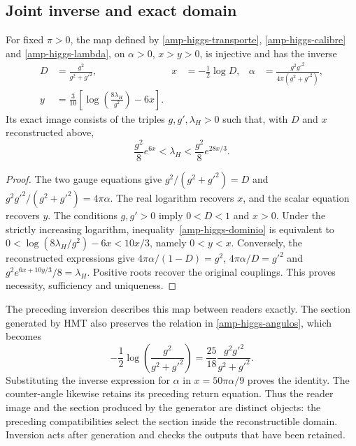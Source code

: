 \subsection{Joint inverse and exact domain}

\begin{theorem}
\label{amp-higgs-inversa-teorema}
For fixed $\pi>0$, the map defined by
\eqref{amp-higgs-transporte}, \eqref{amp-higgs-calibre} and
\eqref{amp-higgs-lambda}, on $\alpha>0$, $x>y>0$, is injective and has
the inverse
\begin{equation}
 \begin{aligned}
 D&=\frac{g^2}{g^2+g'^2},&
 x&=-\frac12\log D,&
 \alpha&=\frac{g^2g'^2}{4\pi(g^2+g'^2)},\\
 y&=\frac3{10}\left[\log\!\left(\frac{8\lambda_H}{g^2}\right)-6x\right].
 \end{aligned}
 \label{amp-higgs-inversa}
\end{equation}
Its exact image consists of the triples $g,g',\lambda_H>0$ such that,
with $D$ and $x$ reconstructed above,
\begin{equation}
 \frac{g^2}{8}e^{6x}<\lambda_H<\frac{g^2}{8}e^{28x/3}.
 \label{amp-higgs-dominio}
\end{equation}
\end{theorem}
\begin{proof}
The two gauge equations give
$g^2/(g^2+g'^2)=D$ and
$g^2g'^2/(g^2+g'^2)=4\pi\alpha$. The real logarithm recovers $x$,
and the scalar equation recovers $y$. The conditions $g,g'>0$ imply
$0<D<1$ and $x>0$. Under the strictly increasing logarithm,
inequality~\eqref{amp-higgs-dominio} is equivalent to
$0<\log(8\lambda_H/g^2)-6x<10x/3$, namely $0<y<x$.
Conversely, the reconstructed expressions give
$4\pi\alpha/(1-D)=g^2$, $4\pi\alpha/D=g'^2$ and
$g^2e^{6x+10y/3}/8=\lambda_H$. Positive roots recover the original
couplings. This proves necessity, sufficiency and uniqueness.
\end{proof}

The preceding inversion describes this map between readers exactly.
The section generated by HMT also preserves the relation in
\eqref{amp-higgs-angulos}, which becomes
\begin{equation}
 -\frac12\log\!\left(\frac{g^2}{g^2+g'^2}\right)
 =\frac{25}{18}\frac{g^2g'^2}{g^2+g'^2}.
 \label{amp-higgs-compatibilidad-alpha}
\end{equation}
Substituting the inverse expression for $\alpha$ in $x=50\pi\alpha/9$
proves the identity. The counter-angle likewise retains its preceding return
equation. Thus the reader image and the section produced by the generator
are distinct objects: the preceding compatibilities select the section
inside the reconstructible domain. Inversion acts after generation and
checks the outputs that have been retained.

